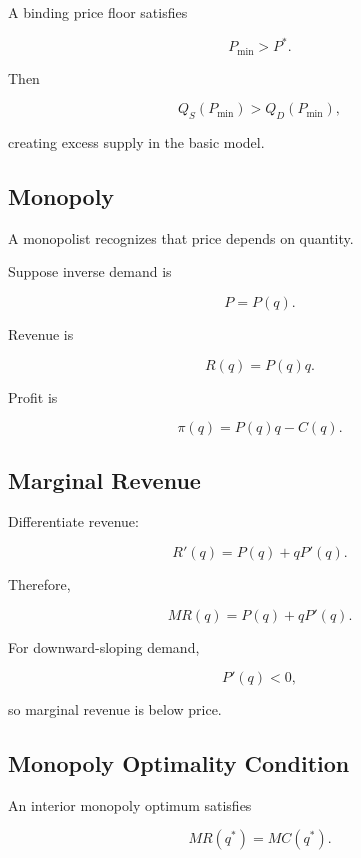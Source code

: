 A binding price floor satisfies

\[
\boxed{
P_{\min}>P^*.
}
\]

Then

\[
Q_S(P_{\min})
>
Q_D(P_{\min}),
\]

creating excess supply in the basic model.

\subsection{Monopoly}
\label{subsec:monopoly}

A monopolist recognizes that price depends on quantity.

Suppose inverse demand is

\[
P=P(q).
\]

Revenue is

\[
\boxed{
R(q)
=
P(q)q.
}
\]

Profit is

\[
\boxed{
\pi(q)
=
P(q)q-C(q).
}
\]

\subsection{Marginal Revenue}
\label{subsec:monopoly-marginal-revenue}

Differentiate revenue:

\[
R'(q)
=
P(q)
+
qP'(q).
\]

Therefore,

\[
\boxed{
MR(q)
=
P(q)
+
qP'(q).
}
\]

For downward-sloping demand,

\[
P'(q)<0,
\]

so marginal revenue is below price.

\subsection{Monopoly Optimality Condition}
\label{subsec:monopoly-optimality}

An interior monopoly optimum satisfies

\[
\boxed{
MR(q^*)=MC(q^*).
}
\]

